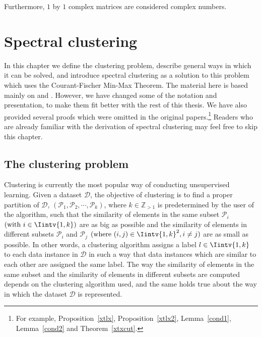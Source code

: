 Furthermore, $1$ by $1$ complex matrices are considered complex numbers.





\chapter{Spectral clustering}
In this chapter we define the clustering problem, describe general ways in which it can be solved, and introduce
spectral clustering as a solution to this problem which uses the Courant-Fischer Min-Max Theorem.
The material here is based mainly on \cite{ng} and \cite{tutorial}.
However, we have changed some of the notation and presentation, to make them fit better with the rest of this thesis.
We have also provided several proofs which were omitted in the original papers.\footnote{For example, Proposition~\vref{xtlx}, Proposition~\vref{xtlx2}, Lemma~\vref{cond1}, Lemma~\vref{cond2} and Theorem~\vref{xtxcut}.}
Readers who are already familiar with the derivation of spectral clustering may feel free to skip this chapter. 

\section{The clustering problem}

Clustering is currently the most popular way of conducting unsupervised learning. 
Given a dataset $\mathcal D$, the objective of clustering is to find a proper partition of $\mathcal D$, $(\mathcal P_1, \mathcal P_2, \cdots, \mathcal P_k)$, where $k \in \mathbb Z_{>1}$ is predetermined by the user of the algorithm, such that the similarity of elements in the same subset $\mathcal P_i$  $(\text{with } i \in \Iintv{1,k})$ are as big as possible and the similarity of elements in different subsets $\mathcal P_i$ and $\mathcal P_j$ $(\text{where } (i,j) \in \Iintv{1,k}^2, i \ne j)$ are as small as possible. 
In other words, a clustering algorithm assigns a label $l \in \Iintv{1,k}$ to each data instance in $\mathcal D$ in such a way that data instances which are similar to each other are assigned the same label.
The way the similarity of elements in the same subset and the similarity of elements in different subsets are computed depends on the clustering algorithm used, and the same holds true about the way in which the dataset $\mathcal D$ is represented.


